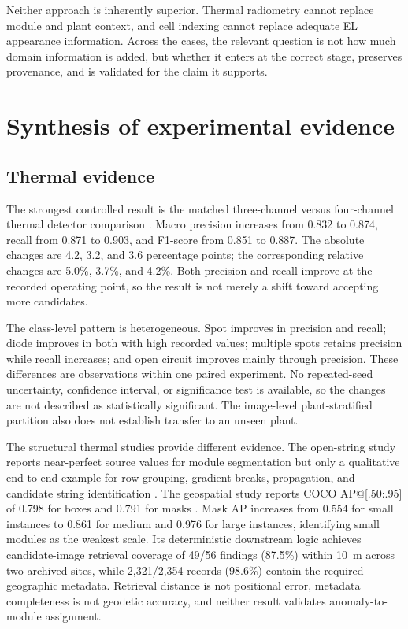 \documentclass[12pt,a4paper]{report}
\begin{document}
Neither approach is inherently superior. Thermal radiometry cannot replace module and plant context, and cell indexing cannot replace adequate EL appearance information. Across the cases, the relevant question is not how much domain information is added, but whether it enters at the correct stage, preserves provenance, and is validated for the claim it supports.

\section{Synthesis of experimental evidence}
\label{sec:ch07-experimental-synthesis}

\subsection{Thermal evidence}

The strongest controlled result is the matched three-channel versus four-channel thermal detector comparison \citep{src004}. Macro precision increases from 0.832 to 0.874, recall from 0.871 to 0.903, and F1-score from 0.851 to 0.887. The absolute changes are 4.2, 3.2, and 3.6 percentage points; the corresponding relative changes are 5.0\%, 3.7\%, and 4.2\%. Both precision and recall improve at the recorded operating point, so the result is not merely a shift toward accepting more candidates.

The class-level pattern is heterogeneous. Spot improves in precision and recall; diode improves in both with high recorded values; multiple spots retains precision while recall increases; and open circuit improves mainly through precision. These differences are observations within one paired experiment. No repeated-seed uncertainty, confidence interval, or significance test is available, so the changes are not described as statistically significant. The image-level plant-stratified partition also does not establish transfer to an unseen plant.

The structural thermal studies provide different evidence. The open-string study reports near-perfect source values for module segmentation but only a qualitative end-to-end example for row grouping, gradient breaks, propagation, and candidate string identification \citep{src003}. The geospatial study reports COCO AP@[.50:.95] of 0.798 for boxes and 0.791 for masks \citep{src005}. Mask AP increases from 0.554 for small instances to 0.861 for medium and 0.976 for large instances, identifying small modules as the weakest scale. Its deterministic downstream logic achieves candidate-image retrieval coverage of 49/56 findings (87.5\%) within 10~m across two archived sites, while 2,321/2,354 records (98.6\%) contain the required geographic metadata. Retrieval distance is not positional error, metadata completeness is not geodetic accuracy, and neither result validates anomaly-to-module assignment.
\end{document}
